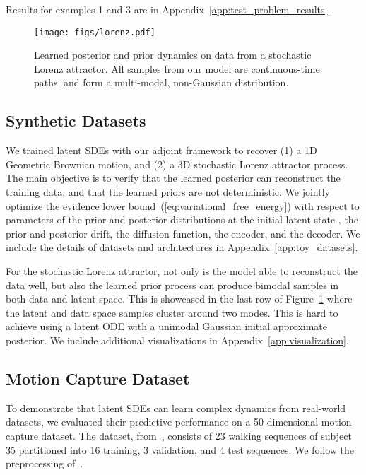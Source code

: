 \documentclass[twoside]{article}
\begin{document}
Results for examples 1 and 3 are in Appendix~\ref{app:test_problem_results}.
\begin{figure}[ht]
\begin{minipage}[ht]{\linewidth}
\centering
{\texttt{[image: figs/lorenz.pdf]}}
\end{minipage}
\caption{
Learned posterior and prior dynamics on data from a stochastic Lorenz attractor.
All samples from our model are continuous-time paths, and form a multi-modal, non-Gaussian distribution.
}
\label{fig:toy_experiments_lorenz}
\end{figure}

\subsection{Synthetic Datasets}
We trained latent SDEs with our adjoint framework to recover (1) a 1D Geometric Brownian motion, and (2) a 3D stochastic Lorenz attractor process. 
The main objective is to verify that the learned posterior can reconstruct the training data, and that the learned priors are not deterministic. 
We jointly optimize the evidence lower bound~(\ref{eq:variational_free_energy}) with respect to parameters of the prior and posterior distributions at the initial latent state , the prior and posterior drift, the diffusion function, the encoder, and the decoder.
We include the details of datasets and architectures in Appendix~\ref{app:toy_datasets}.

For the stochastic Lorenz attractor, not only is the model able to reconstruct the data well, but also the learned prior process can produce bimodal samples in both data and latent space. 
This is showcased in the last row of Figure~\ref{fig:toy_experiments_lorenz} where the latent and data space samples cluster around two modes.
This is hard to achieve using a latent ODE with a unimodal Gaussian initial approximate posterior.
We include additional visualizations in Appendix~\ref{app:visualization}.

\newcommand{\rpm}{\raisebox{.2ex}{}}

\subsection{Motion Capture Dataset}
To demonstrate that latent SDEs can learn complex dynamics from real-world datasets, we evaluated their predictive performance on a 50-dimensional motion capture dataset.
The dataset, from~\citet{gan2015deep}, consists of 23 walking sequences of subject 35 partitioned into 16 training, 3 validation, and 4 test sequences. We follow the preprocessing of~\citet{wang2007gaussian}.
\end{document}
